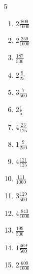 \documentclass[12pt]{article}
\begin{document}
\begin{multicols}{5}
\begin{enumerate}
\item $ 2 \frac{809}{1000} $
\item $ 2 \frac{259}{1000} $
\item $ \frac{187}{500} $
\item $ 2 \frac{9}{25} $
\item $ 3 \frac{7}{500} $
\item $ 2 \frac{1}{5} $
\item $ 4 \frac{23}{125} $
\item $ 1 \frac{9}{250} $
\item $ 4 \frac{121}{125} $
\item $ \frac{111}{1000} $
\item $ 3 \frac{129}{500} $
\item $ 4 \frac{843}{1000} $
\item $ \frac{199}{500} $
\item $ 1 \frac{469}{500} $
\item $ 2 \frac{609}{1000} $
\end{enumerate}\end{multicols}\newpage
\end{document}
